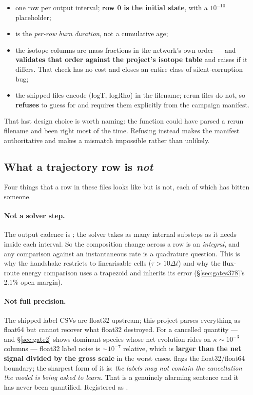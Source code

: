 \begin{itemize}
\item one row per output interval; \textbf{row 0 is the initial state}, with
   a $10^{-10}$ placeholder;
\item {} is the \emph{per-row burn duration}, not a cumulative age;
\item the isotope columns are mass fractions in the network's own order --- and
   \textbf{validates that order against the project's
  isotope table} and raises if it differs. That check has no cost and closes an
  entire class of silent-corruption bug;
\item the shipped files encode (logT, logRho) in the filename; rerun files do
  not, so  \textbf{refuses} to guess for
   and requires them explicitly from the campaign manifest.
\end{itemize}

That last design choice is worth naming: the function could have parsed a rerun
filename and been right most of the time. Refusing instead makes the manifest
authoritative and makes a mismatch impossible rather than unlikely.

\subsection{What a trajectory row is \emph{not}}
\label{sec:rowisnot}

Four things that a row in these files looks like but is not, each of which has
bitten someone.

\paragraph{Not a solver step.} The output cadence is ; the
solver takes as many internal substeps as it needs inside each interval. So the
composition change across a row is an \emph{integral}, and any comparison
against an instantaneous rate is a quadrature question. This is why the
handshake restricts to linearisable cells ($\tau > 10\Delta t$) and why the
flux-route energy comparison uses a trapezoid and inherits its error
(\S\ref{sec:gates378}'s 2.1\% open margin).

\paragraph{Not full precision.} The shipped label CSVs are float32 upstream;
this project parses everything as float64 but cannot recover what float32
destroyed. For a cancelled quantity --- and \S\ref{sec:gate2} shows dominant
species whose net evolution rides on $\kappa \sim 10^{-3}$ columns --- float32
label noise is ${\sim}10^{-7}$ relative, which is \textbf{larger than the net
signal divided by the gross scale} in the worst cases.  flags
the float32/float64 boundary; the sharpest form of it is: \emph{the labels may
not contain the cancellation the model is being asked to learn.} That is a
genuinely alarming sentence and it has never been quantified. Registered as
.

